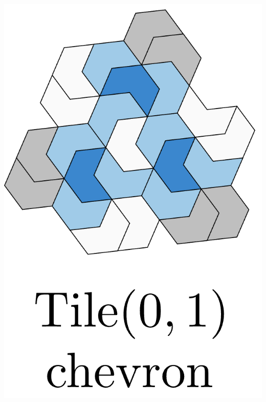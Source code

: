 \documentclass[class=beamer, crop=false]{standalone}
\begin{document}
\begin{minipage}{0.24\textwidth}
    \centering
  \begin{minipage}[t]{0.24\textwidth}
    \centering
    \includegraphics[width=\linewidth]{images/polykite-family/chevron(0,1).png}
  \end{minipage}\hfill
  \begin{minipage}[t]{0.24\textwidth}
    \centering

\end{minipage}
\end{minipage}
\end{document}
